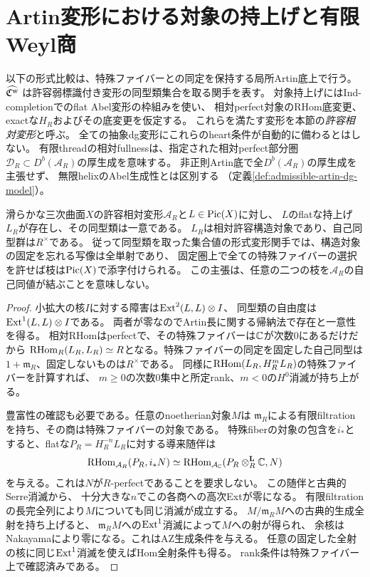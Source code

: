 \section{Artin変形における対象の持上げと有限Weyl商}\label{sec:weyl}
以下の形式比較は、特殊ファイバーとの同定を保持する局所Artin底上で行う。
$\widehat{\mathfrak C^{\rm w}}$ は許容弱標識付き変形の同型類集合を取る関手を表す。
対象持上げにはInd-completionでのflat Abel変形の枠組みを使い、
相対perfect対象のRHom底変更、exactな$H_R$およびその底変更を仮定する。
これらを満たす変形を本節の\emph{許容相対変形}と呼ぶ。
全ての抽象dg変形にこれらのheart条件が自動的に備わるとはしない。
有限threadの相対fullnessは、指定された相対perfect部分圏
$\mathcal D_R\subset D^b(\mathcal A_R)$の厚生成を意味する。
非正則Artin底で全$D^b(\mathcal A_R)$の厚生成を主張せず、
無限helixのAbel生成性とは区別する
（定義\ref{def:admissible-artin-dg-model}）。

\begin{theorem}[構造対象の形式的な選択]\label{thm:formal-structure}
滑らかな三次曲面$X$の許容相対変形$\mathcal A_R$と$L\in\operatorname{Pic}(X)$に対し、
$L$のflatな持上げ$L_R$が存在し、その同型類は一意である。
$L_R$は相対許容構造対象であり、自己同型群は$R^\times$である。
従って同型類を取った集合値の形式変形関手では、構造対象の固定を忘れる写像は全単射であり、
固定圏上で全ての特殊ファイバーの選択を許せば枝は$\operatorname{Pic}(X)$で添字付けられる。
この主張は、任意の二つの枝を$\mathcal A_R$の自己同値が結ぶことを意味しない。
\end{theorem}
\begin{proof}
小拡大の核$I$に対する障害は$\operatorname{Ext}^2(L,L)\otimes I$、
同型類の自由度は$\operatorname{Ext}^1(L,L)\otimes I$である\cite[Theorem A and flat dual]{Lowen}。
両者が零なのでArtin長に関する帰納法で存在と一意性を得る。
相対RHomはperfectで、その特殊ファイバーは$\mathbb C$が次数0にあるだけだから
$\operatorname{RHom}_R(L_R,L_R)\simeq R$となる。特殊ファイバーの同定を固定した自己同型は
$1+\mathfrak m_R$、固定しないものは$R^\times$である。
同様に$\operatorname{RHom}(L_R,H_R^mL_R)$の特殊ファイバーを計算すれば、
$m\ge0$の次数0集中と所定rank、$m<0$の$H^0$消滅が持ち上がる。

豊富性の確認も必要である。任意のnoetherian対象$M$は
$\mathfrak m_R$による有限filtrationを持ち、その商は特殊ファイバーの対象である。
特殊fiberの対象の包含を$i_*$とすると、flatな$P_R=H_R^{-n}L_R$に対する導来随伴は
\[
 \operatorname{RHom}_{\mathcal A_R}(P_R,i_*N)
 \simeq\operatorname{RHom}_{\mathcal A_{\mathbb C}}(P_R\otimes_R^{\mathbf L}\mathbb C,N)
\]
を与える。これは$N$が$R$-perfectであることを要求しない。
この随伴と古典的Serre消滅から、
十分大きな$n$でこの各商への高次Extが零になる。
有限filtrationの長完全列により$M$についても同じ消滅が成立する。
$M/\mathfrak m_RM$への古典的生成全射を持ち上げると、
$\mathfrak m_RM$への$\operatorname{Ext}^1$消滅によって$M$への射が得られ、
余核はNakayamaにより零になる。これはAZ生成条件を与える。
任意の固定した全射の核に同じ$\operatorname{Ext}^1$消滅を使えばHom全射条件も得る。
rank条件は特殊ファイバー上で確認済みである。
\end{proof}

